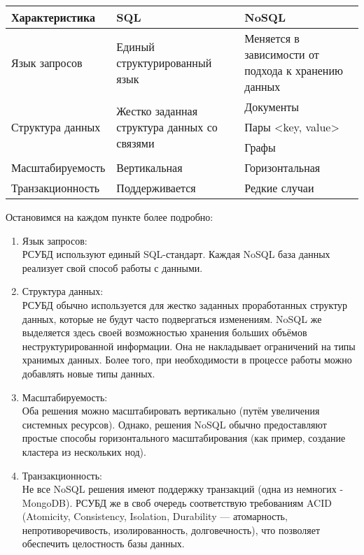 \documentclass[14pt, a4paper, russian]{report}
\begin{document}
\begin{tabular}{ |p{4cm}|p{5cm}|p{5cm}|  }
	\hline
 	\textbf{Характеристика} & \textbf{SQL} & \textbf{NoSQL}\\
 	\hline
 	Язык запросов    & Единый структурированный язык & Меняется в зависимости от подхода к хранению данных \\
 	\hline
 	\multirow{3}{4cm}{Структура данных} & \multirow{3}{5cm}{Жестко заданная структура данных со связями} &Документы \\ \cline{3-3}
	& & Пары <key, value> \\ \cline{3-3}
	& & Графы \\\cline{3-3}
	\hline
	Масштабируемость & Вертикальная &  Горизонтальная \\
	\hline
	Транзакционность & Поддерживается &  Редкие случаи \\
 	\hline
\end{tabular}
\newline \newline
Остановимся на каждом пункте более подробно:
\begin{enumerate}
	\item Язык запросов: \\ РСУБД используют единый SQL-стандарт. Каждая NoSQL база данных реализует свой способ работы с данными.
	\item Структура данных: \\ РСУБД обычно используется для жестко заданных проработанных структур данных, которые не будут часто подвергаться изменениям. NoSQL же выделяется здесь своей возможностью хранения больших объёмов неструктурированной информации. Она не накладывает ограничений на типы хранимых данных. Более того, при необходимости в процессе работы можно добавлять новые типы данных.
	\item Масштабируемость: \\ Оба решения можно масштабировать вертикально (путём увеличения системных ресурсов). Однако, решения NoSQL обычно предоставляют простые способы горизонтального масштабирования (как пример, создание кластера из нескольких нод).
	\item Транзакционность: \\ Не все NoSQL решения имеют поддержку транзакций (одна из немногих - MongoDB). РСУБД же в своб очередь соответствую требованиям ACID (Atomicity, Consistency, Isolation, Durability — атомарность, непротиворечивость, изолированность, долговечность), что позволяет обеспечить целостность базы данных. 
\end{enumerate}
\end{document}
